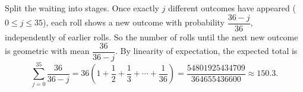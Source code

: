 Split the waiting into stages. Once exactly $j$ different outcomes have appeared ($0\le j\le35$), each roll shows a new outcome with probability $\dfrac{36-j}{36}$, independently of earlier rolls. So the number of rolls until the next new outcome is geometric with mean $\dfrac{36}{36-j}$. By linearity of expectation, the expected total is
\[\sum_{j=0}^{35}\dfrac{36}{36-j}=36\left(1+\dfrac12+\dfrac13+\cdots+\dfrac1{36}\right)=\boxed{\dfrac{54801925434709}{364655436600}}\approx150.3.\]
